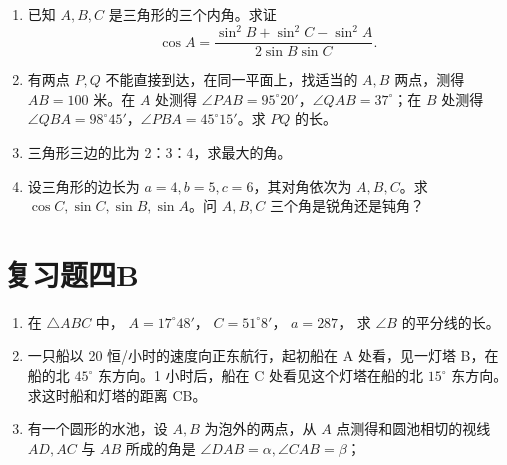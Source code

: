 \begin{enumerate}[start=6]
\item
  已知 \(A, B, C\) 是三角形的三个内角。求证
\[
\cos A = \frac {\sin^ {2} B + \sin^ {2} C - \sin^ {2} A}{2 \sin B \sin C}.
\]
\item
  有两点 \(P, Q\) 不能直接到达，在同一平面上，找适当的 \(A, B\)
  两点，测得 \(AB = 100\) 米。在 \(A\) 处测得
  \(\angle PAB = 95^\circ 20'\)，\(\angle QAB = 37^\circ\)；在 \(B\)
  处测得
  \(\angle QBA = 98^\circ 45'\)，\(\angle PBA = 45^\circ 15'\)。求
  \(PQ\) 的长。
\item
  三角形三边的比为 2：3：4，求最大的角。
\item
  设三角形的边长为 \(a = 4, b = 5, c = 6\)，其对角依次为 \(A, B, C\)。求
  \(\cos C, \sin C, \sin B, \sin A\)。问 \(A, B, C\)
  三个角是锐角还是钝角？
\end{enumerate}

\section{复习题四B}

\begin{enumerate}
\item
  在 \(\triangle ABC\) 中， \(A = 17^{\circ}48'\)，
  \(C = 51^{\circ}8'\)， \(a = 287\)， 求 \(\angle B\) 的平分线的长。
\item
  一只船以 20 恒/小时的速度向正东航行，起初船在 A 处看，见一灯塔
  B，在船的北 \(45^{\circ}\) 东方向。1 小时后，船在 C
  处看见这个灯塔在船的北 \(15^{\circ}\) 东方向。求这时船和灯塔的距离
  CB。
\item
  有一个圆形的水池，设 \(A, B\) 为泡外的两点，从 \(A\)
  点测得和圆池相切的视线 \(AD, AC\) 与 \(AB\) 所成的角是
  \(\angle DAB = \alpha, \angle CAB = \beta\)；
\end{enumerate}

